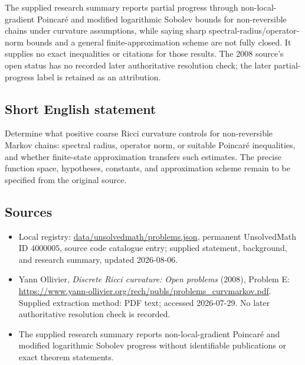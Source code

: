 \documentclass[11pt]{article}
\begin{document}
The supplied research summary reports partial progress through non-local-gradient Poincar\'e and modified logarithmic Sobolev bounds for non-reversible chains under curvature assumptions, while saying sharp spectral-radius/operator-norm bounds and a general finite-approximation scheme are not fully closed. It supplies no exact inequalities or citations for those results. The 2008 source's open status has no recorded later authoritative resolution check; the later partial-progress label is retained as an attribution.
\subsection{Short English statement}
Determine what positive coarse Ricci curvature controls for non-reversible Markov chains: spectral radius, operator norm, or suitable Poincar\'e inequalities, and whether finite-state approximation transfers such estimates. The precise function space, hypotheses, constants, and approximation scheme remain to be specified from the original source.
\subsection{Sources}
\begin{itemize}
\item Local registry: \url{data/unsolvedmath/problems.json}, permanent UnsolvedMath ID \(4000005\), source code catalogue entry; supplied statement, background, and research summary, updated 2026-08-06.
\item Yann Ollivier, \emph{Discrete Ricci curvature: Open problems} (2008), Problem E: \url{https://www.yann-ollivier.org/rech/publs/problems_curvmarkov.pdf}. Supplied extraction method: PDF text; accessed 2026-07-29. No later authoritative resolution check is recorded.
\item The supplied research summary reports non-local-gradient Poincar\'e and modified logarithmic Sobolev progress without identifiable publications or exact theorem statements.
\end{itemize}
\end{document}
